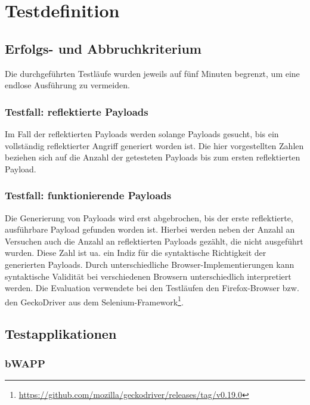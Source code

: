 \section{Testdefinition}\label{eval:TestRuns}

\subsection{Erfolgs- und Abbruchkriterium}

Die durchgeführten Testläufe wurden jeweils auf fünf Minuten begrenzt, um eine endlose Ausführung zu vermeiden. 

\subsubsection{Testfall: reflektierte Payloads}

Im Fall der reflektierten Payloads werden solange Payloads gesucht, bis ein vollständig reflektierter Angriff generiert worden ist. Die hier vorgestellten Zahlen beziehen sich auf die Anzahl der getesteten Payloads bis zum ersten reflektierten Payload.

\subsubsection{Testfall: funktionierende Payloads}

Die Generierung von Payloads wird erst abgebrochen, bis der erste reflektierte, ausführbare Payload gefunden worden ist. Hierbei werden neben der Anzahl an Versuchen auch die Anzahl an reflektierten Payloads gezählt, die nicht ausgeführt wurden. Diese Zahl ist ua. ein Indiz für die syntaktische Richtigkeit der generierten Payloads. Durch unterschiedliche Browser-Implementierungen kann syntaktische Validität bei verschiedenen Browsern unterschiedlich interpretiert werden. Die Evaluation verwendete bei den Testläufen den Firefox-Browser bzw. den GeckoDriver aus dem Selenium-Framework\footnote{\url{https://github.com/mozilla/geckodriver/releases/tag/v0.19.0}}.

\FloatBarrier

\subsection{Testapplikationen}

\subsubsection{bWAPP}

